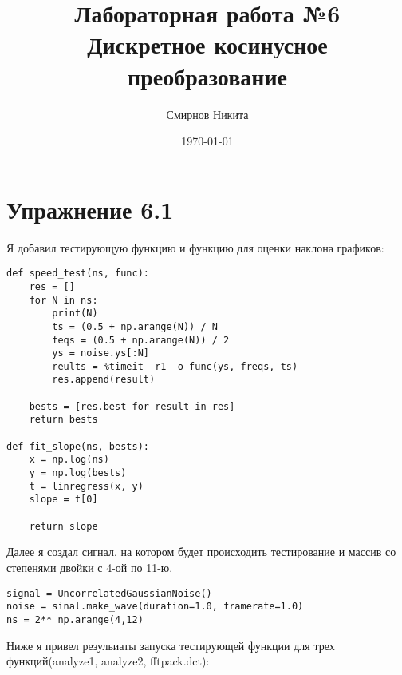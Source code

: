 \documentclass[a4paper,12pt]{report}
\title{Лабораторная работа №6\\Дискретное косинусное преобразование}
\author{Смирнов Никита}
\date{\today}
\begin{document}
\maketitle
\tableofcontents
\listoffigures
\lstlistoflistings

\maketitle

\chapter{Упражнение 6.1}

Я добавил тестирующую функцию и функцию для оценки наклона графиков:

\begin{lstlisting}[caption=Тестирующая функция и функция для оценки наклона графиков]
def speed_test(ns, func):
    res = []
    for N in ns:
        print(N)
        ts = (0.5 + np.arange(N)) / N
        feqs = (0.5 + np.arange(N)) / 2
        ys = noise.ys[:N]
        reults = %timeit -r1 -o func(ys, freqs, ts)
        res.append(result)
        
    bests = [res.best for result in res]
    return bests

def fit_slope(ns, bests):
    x = np.log(ns)
    y = np.log(bests)
    t = linregress(x, y)
    slope = t[0]
    
    return slope
\end{lstlisting}

    Далее я создал сигнал, на котором будет происходить тестирование и массив со степенями двойки с 4-ой по 11-ю.
    

\begin{lstlisting}[caption=Массив степеней двойки]
signal = UncorrelatedGaussianNoise()
noise = sinal.make_wave(duration=1.0, framerate=1.0)
ns = 2** np.arange(4,12)
\end{lstlisting}

Ниже я привел резульиаты запуска тестирующей функции для трех функций(analyze1, analyze2, fftpack.dct):   
\end{document}
